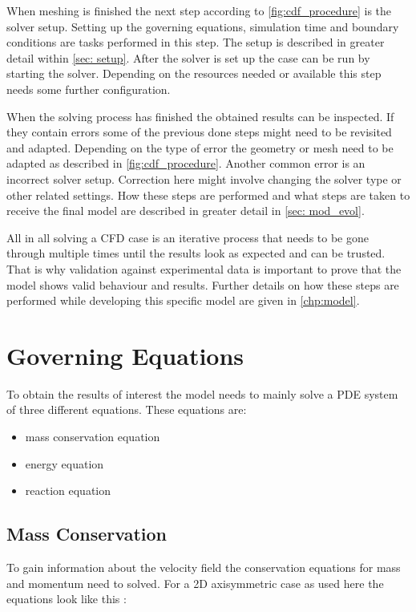 \documentclass[../thesis.tex]{subfiles}
\begin{document}
When meshing is finished the next step according to \autoref{fig:cdf_procedure} is the solver setup. Setting up the governing equations, simulation time and boundary conditions are tasks performed in this step. The setup is described in greater detail within \autoref{sec: setup}. After the solver is set up the case can be run by starting the solver. Depending on the resources needed or available this step needs some further configuration.

When the solving process has finished the obtained results can be inspected. If they contain errors some of the previous done steps might need to be revisited and adapted. Depending on the type of error the geometry or mesh need to be adapted as described in \autoref{fig:cdf_procedure}. Another common error is an incorrect solver setup. Correction here might involve changing the solver type or other related settings. How these steps are performed and what steps are taken to receive the final model are described in greater detail in \autoref{sec: mod_evol}.

All in all solving a CFD case is an iterative process that needs to be gone through multiple times until the results look as expected and can be trusted. That is why validation against experimental data is important to prove that the model shows valid behaviour and results. Further details on how these steps are performed while developing this specific model are given in \autoref{chp:model}.

\section{Governing Equations}
\label{sec:gov_eqn}
To obtain the results of interest the model needs to mainly solve a PDE system of three different equations. These equations are:
\begin{itemize}
	\item mass conservation equation
	\item energy equation
	\item reaction equation
\end{itemize}

\subsection{Mass Conservation}
To gain information about the velocity field the conservation equations for mass and momentum need to solved. For a 2D axisymmetric case as used here the equations look like this \cite{manual2009ansys}:
\end{document}

